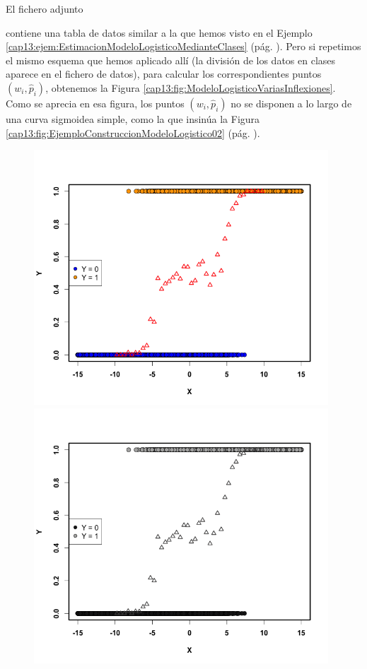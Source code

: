 \begin{ejemplo}
\label{cap13:ejem:EstimacionModeloLogisticoVariasInflexiones}
El fichero adjunto
\begin{center}
\end{center}
contiene una tabla de datos similar a la que hemos visto en el Ejemplo \ref{cap13:ejem:EstimacionModeloLogisticoMedianteClases} (pág. \pageref{cap13:ejem:EstimacionModeloLogisticoMedianteClases}). Pero si repetimos el mismo esquema que hemos aplicado allí (la división de los datos en clases aparece en el fichero de datos), para calcular los correspondientes puntos $(w_i, \hat p_i)$, obtenemos la Figura
\ref{cap13:fig:ModeloLogisticoVariasInflexiones}. Como se aprecia en esa figura, los puntos $(w_i, \hat p_i)$ no se disponen a lo largo de una curva sigmoidea simple, como la que insinúa la Figura \ref{cap13:fig:EjemploConstruccionModeloLogistico02} (pág. \pageref{cap13:fig:EjemploConstruccionModeloLogistico02}).
\begin{figure}[h!]
\begin{center}
\begin{enColor}
    \includegraphics[width=11cm]{../fig/Cap13-EstimacionModeloLogisticoVariasInflexiones.png}
\end{enColor}
\begin{bn}
    \includegraphics[width=11cm]{../fig/Cap13-EstimacionModeloLogisticoVariasInflexiones-bn.png}

\end{bn}
\end{center}
\end{figure}
\end{ejemplo}
